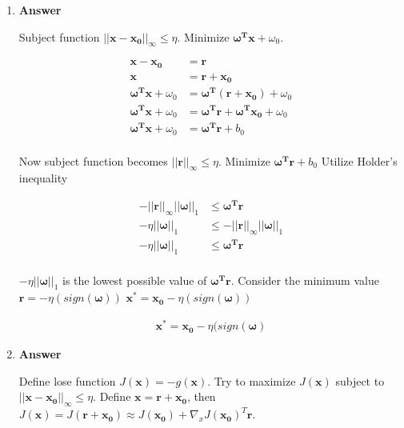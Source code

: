 \documentclass[11pt]{article}
\begin{document}
\begin{enumerate}[label=(\alph*)]
\begin{enumerate}[label=(\roman*)]
\item \noindent\textbf{Answer}

Subject function $||\mathbf{x}-\mathbf{x_0}||_\infty \leq \eta$. Minimize $ \boldsymbol{\omega^T}\mathbf{x} + \omega_0 $.

\begin{align*}
\mathbf{x}-\mathbf{x_0} &= \mathbf{r} \\
\mathbf{x} &= \mathbf{r} + \mathbf{x_0}\\
\boldsymbol{\omega^T}\mathbf{x} + \omega_0 &= \boldsymbol{\omega^T}( \mathbf{r} + \mathbf{x_0}) + \omega_0\\
\boldsymbol{\omega^T}\mathbf{x} + \omega_0 &= \boldsymbol{\omega^T}\mathbf{r} + \boldsymbol{\omega^T}\mathbf{x_0} + \omega_0\\
\boldsymbol{\omega^T}\mathbf{x} + \omega_0 &= \boldsymbol{\omega^T}\mathbf{r} + b_0\\
\end{align*}

Now subject function becomes $||\mathbf{r}||_\infty \leq \eta $. Minimize $ \boldsymbol{\omega^T}\mathbf{r} + b_0$ Utilize Holder’s inequality

\begin{align*}
- ||\mathbf{r}||_\infty ||\boldsymbol{\omega}||_1  & \leq  \boldsymbol{\omega^T}\mathbf{r} \\
 -\eta  ||\boldsymbol{\omega}||_1& \leq - ||\mathbf{r}||_\infty ||\boldsymbol{\omega}||_1 \\
 -\eta  ||\boldsymbol{\omega}||_1&  \leq  \boldsymbol{\omega^T}\mathbf{r} \\
\end{align*}

$-\eta  ||\boldsymbol{\omega}||_1$ is the lowest possible value of $\boldsymbol{\omega^T}\mathbf{r}$. Consider the minimum value $\mathbf{r} = -\eta (sign(\boldsymbol{\omega}))$ $\mathbf{x^*} = \mathbf{x_0} - \eta (sign(\boldsymbol{\omega}))$

\begin{align*}
\mathbf{x^*} = \mathbf{x_0} - \eta (sign(\boldsymbol{\omega})
\end{align*}

\item \noindent\textbf{Answer}

Define lose function $J(\mathbf{x}) = -g(\mathbf{x})$. Try to maximize $J(\mathbf{x})$ subject to $||\mathbf{x}-\mathbf{x_0}||_\infty \leq \eta$. Define $\mathbf{x} = \mathbf{r} + \mathbf{x_0}$, then $J(\mathbf{x}) = J(\mathbf{r} + \mathbf{x_0}) \approx J(  \mathbf{x_0}) + \nabla_x J(  \mathbf{x_0})^T \mathbf{r}$. 


\end{enumerate}
\end{enumerate}
\end{document}
